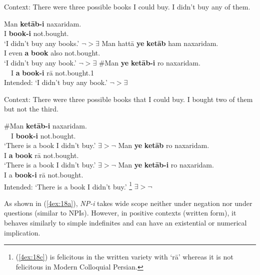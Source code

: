 \documentclass[output=paper]{langsci/langscibook}
\begin{document}
\begin{exe}
\ex\label{4ex:17}
{Context: There were three possible books I could buy. I didn't buy any of them.}
	\begin{xlista}
	\ex\label{4ex:17a}
	\gll	Man  {\bf{ketāb-i}}  	naxaridam. \\
                	I       	{\bf{book-i}}   	not.bought.{} \\
        \glt	`I didn't buy any books.'   \hfill $\neg > \exists$
	\ex\label{4ex:17b}
	\gll	Man 	hattā  	{\bf{ye}} {\bf{ketāb}} 	 ham  	naxaridam. \\
                	I        even  	{\bf{a}}   {\bf{book}}   also  	not.bought.{} \\
         \glt	`I didn't buy any book.'	\hfill $\neg > \exists$ 
	\ex\label{4ex:17c}
       	\gll	\#Man   {\bf{ye}} {\bf{ketāb-i}}   ro  	naxaridam. \\
                 \ \ I        {\bf{a}}    {\bf{book-i}}    rā   	not.bought.1{} \\
       	\glt	Intended: `I didn't buy any book.'	\hfill *$\neg > \exists$
	\end{xlista}
\ex\label{4ex:18}
{Context: There were three possible books that I could buy. I bought two of  them but not the third.}
	\begin{xlista}
	\ex\label{4ex:18a}
	\gll \#Man {\bf{ketāb-i}} naxaridam. \\
               \ \ I {\bf{book-i}} not.bought.{} \\
        \glt `There is a book I didn't buy.'  \hfill *$\exists > \neg$
	\ex\label{4ex:18b}
	\gll Man {\bf{ye}} {\bf{ketāb}} ro naxaridam. \\
         I {\bf{a}} {\bf{book}} rā not.bought.{} \\
        \glt `There is a book I didn't buy.'  \hfill $\exists > \neg$
	\ex\label{4ex:18c}
	\gll Man {\bf{ye}} {\bf{ketāb-i}} ro naxaridam. \\
          I a {\bf{book-i}} rā not.bought.{} \\
        \glt Intended: `There is a book I didn't buy.'	\footnote{(\ref{4ex:18c}) is felicitous in the written variety with {} `rā' whereas it is not felicitous in Modern Colloquial Persian.}  \hfill $\exists > \neg$
	\end{xlista}
\end{exe}

{
As shown in (\ref{4ex:18a}), {\emph{NP-i}} takes wide scope neither under negation nor under questions (similar to NPIs). However, in positive contexts (written form), it behaves similarly to simple indefinites and can have an existential or numerical implication. 
}
\end{document}
